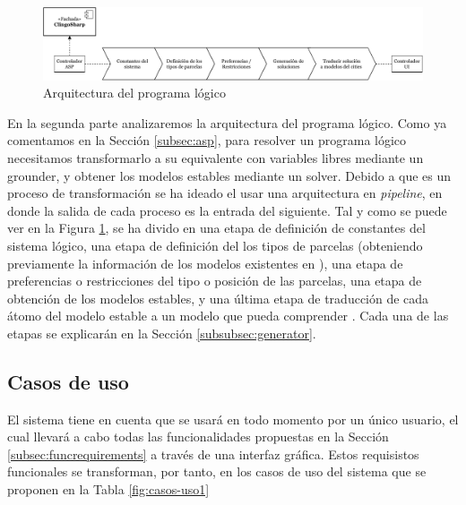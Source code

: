 \begin{figure}[!h]
	\centering
	\includegraphics[width=\textwidth]{images/arquitectura-asp}
	\caption{Arquitectura del programa lógico}
	\label{fig:arquitectura-asp}
\end{figure}

En la segunda parte analizaremos la arquitectura del programa lógico. Como ya comentamos en la Sección \ref{subsec:asp}, para resolver un programa lógico necesitamos transformarlo a su equivalente con variables libres mediante un grounder, y obtener los modelos estables mediante un solver. Debido a que es un proceso de transformación se ha ideado el usar una arquitectura en \textit{pipeline}, en donde la salida de cada proceso es la entrada del siguiente. Tal y como se puede ver en la Figura \ref{fig:arquitectura-asp}, se ha divido en una etapa de definición de constantes del sistema lógico, una etapa de definición del los tipos de parcelas (obteniendo previamente la información de los modelos existentes en \cities), una etapa de preferencias o restricciones del tipo o posición de las parcelas, una etapa de obtención de los modelos estables, y una última etapa de traducción de cada átomo del modelo estable a un modelo que pueda comprender \cities. Cada una de las etapas se explicarán en la Sección \ref{subsubsec:generator}.

\subsection{Casos de uso}
\label{subsec:cases}

El sistema tiene en cuenta que se usará en todo momento por un único usuario, el cual llevará a cabo todas las funcionalidades propuestas en la Sección \ref{subsec:funcrequirements} a través de una interfaz gráfica. Estos requisistos funcionales se transforman, por tanto, en los casos de uso del sistema que se proponen en la Tabla \ref{fig:casos-uso1}

